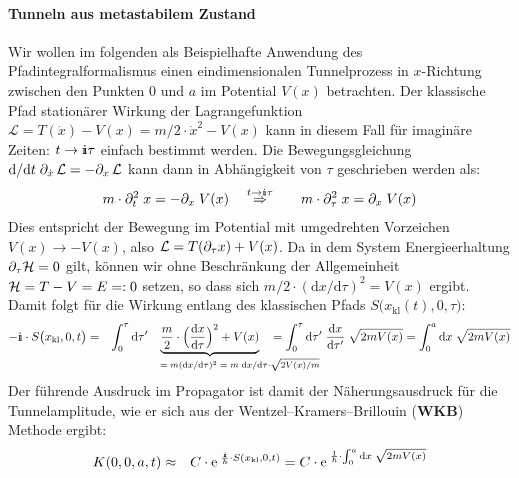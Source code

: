 \paragraph{Tunneln aus metastabilem Zustand}

Wir wollen im folgenden als Beispielhafte Anwendung des Pfadintegralformalismus einen eindimensionalen Tunnelprozess in $x$-Richtung zwischen den Punkten $0$ und $a$ im Potential $V(x)$ betrachten. Der klassische Pfad stationärer Wirkung der Lagrangefunktion $\mathcal{L}=T(\dot{x})-V(x)=m/2\cdot\dot{x}^2-V(x)$ kann in diesem Fall für imaginäre Zeiten: $t\to \I\tau$ einfach bestimmt werden. Die Bewegungsgleichung $\mathrm{d}/\mathrm{d}t\;\partial_{\dot{x}}\,\mathcal{L}=-\partial_x\,\mathcal{L}$ kann dann in Abhängigkeit von $\tau$ geschrieben werden als: 
\begin{eqnarray*}
	m\cdot\dell_t^2\; x = -\dell_x\; V(x) &\quad\overset{t\to \I\tau}{\Rightarrow}\quad& m\cdot \dell_{\tau}^2\; x = \dell_x\; V(x) 
\end{eqnarray*}
Dies entspricht der Bewegung im Potential mit umgedrehten Vorzeichen $V(x)\to-V(x)$, also $\mathcal{L}=T(\partial_{\tau}x)+V(x)$. Da in dem System Energieerhaltung $\partial_{\tau} \mathcal H = 0$ gilt, können wir ohne Beschränkung der Allgemeinheit $\mathcal H=T-V=E=:0$ setzen, so dass sich $m/2\cdot(\mathrm{d}x/\mathrm{d}\tau)^2 = V(x)$ ergibt. Damit folgt für die Wirkung entlang des klassischen Pfads $S\big(x_{\text{kl}}(t),0,\tau\big)$: 
\begin{eqnarray*}
	-\I\cdot S\big(x_{\text{kl}},0,t\big) &=& \int_0^{\tau}\mathrm{d}\tau'\!\!\!\!\!\!\!\!\!\!\!\!\!\!\!\!\!\!\!\!\!\!\!\!\!\underbrace{\frac{m}{2}\cdot\Big(\frac{\mathrm{d}x}{\mathrm{d}\tau}\Big)^2+V(x)}_{\qquad\quad\qquad=\;m(\mathrm{d}x/\mathrm{d}\tau)^2\;=\;m\;\mathrm{d}x/\mathrm{d}\tau\cdot\sqrt{2V(x)/m}}\!\!\!\!\!\!\!\!\!\!\!\!\!\!\!\!\!\!\!\!\!\!\!\!\! = \int_0^{\tau} \mathrm{d}\tau'\;\frac{\mathrm{d}x}{\mathrm{d}\tau'}\; \sqrt{2mV(x)} = \int_0^a\mathrm{d}x\; \sqrt{2m V(x)}
\end{eqnarray*}
Der führende Ausdruck im Propagator ist damit der Näherungsausdruck für die Tunnelamplitude, wie er sich aus der Wentzel–Kramers–Brillouin ({\bf WKB}) Methode ergibt: 
\begin{eqnarray*}
	K(0,0,a,t) &\approx& C\cdot\e^{\;\frac{\I}{\hbar}\cdot S(x_{\text{kl}},0,t)}=C\cdot\e^{\;\frac{1}{\hbar}\cdot\int_0^a\mathrm{d}x\;\sqrt{2mV(x)}}
\end{eqnarray*}


